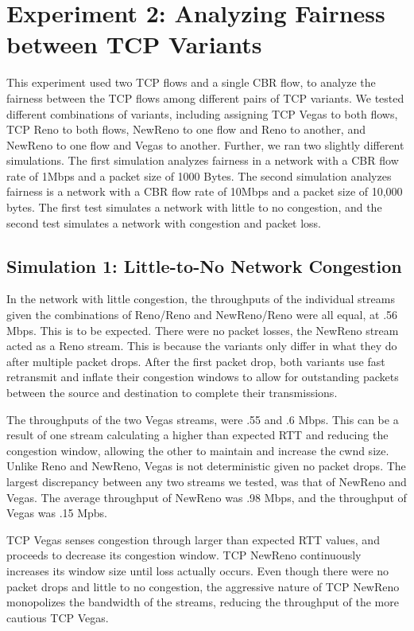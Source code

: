 \section{Experiment 2: Analyzing Fairness between TCP Variants}

This experiment used two TCP flows and a single CBR flow, to analyze the fairness between the TCP flows among different pairs of TCP variants. We tested different combinations of variants, including assigning TCP Vegas to both flows, TCP Reno to both flows, NewReno to one flow and Reno to another, and NewReno to one flow and Vegas to another. Further, we ran two slightly different simulations. The first simulation analyzes fairness in a network with a CBR flow rate of 1Mbps and a packet size of 1000 Bytes. The second simulation analyzes fairness is a network with a CBR flow rate of 10Mbps and a packet size of 10,000 bytes. The first test simulates a network with little to no congestion, and the second test simulates a network with congestion and packet loss.

\subsection{Simulation 1: Little-to-No Network Congestion}

In the network with little congestion, the throughputs of the individual streams given the combinations of Reno/Reno and NewReno/Reno were all equal, at .56 Mbps. This is to be expected. There were no packet losses, the NewReno stream acted as a Reno stream. This is because the variants only differ in what they do after multiple packet drops. After the first packet drop, both variants use fast retransmit and inflate their congestion windows to allow for outstanding packets between the source and destination to complete their transmissions. 

The throughputs of the two Vegas streams, were .55 and .6 Mbps. This can be a result of one stream calculating a higher than expected RTT and reducing the congestion window, allowing the other to maintain and increase the cwnd size. Unlike Reno and NewReno, Vegas is not deterministic given no packet drops. The largest discrepancy between any two streams we tested, was that of NewReno and Vegas. The average throughput of NewReno was .98 Mbps, and the throughput of Vegas was .15 Mpbs. 

TCP Vegas senses congestion through larger than expected RTT values, and proceeds to decrease its congestion window. TCP NewReno continuously increases its window size until loss actually occurs. Even though there were no packet drops and little to no congestion, the aggressive nature of TCP NewReno monopolizes the bandwidth of the streams, reducing the throughput of the more cautious TCP Vegas.

